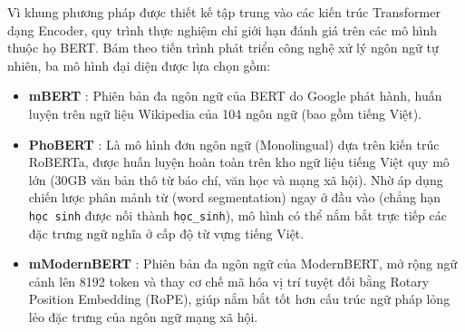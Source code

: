 Vì khung phương pháp được thiết kế tập trung vào các kiến trúc Transformer dạng Encoder, quy trình thực nghiệm chỉ giới hạn đánh giá trên các mô hình thuộc họ BERT. Bám theo tiến trình phát triển công nghệ xử lý ngôn ngữ tự nhiên, ba mô hình đại diện được lựa chọn gồm:
\begin{itemize}
    \item \textbf{mBERT} \parencite{devlin2019bert}: Phiên bản đa ngôn ngữ của BERT do Google phát hành, huấn luyện trên ngữ liệu Wikipedia của 104 ngôn ngữ (bao gồm tiếng Việt).
    \item \textbf{PhoBERT} \parencite{nguyen2020phobert}: Là mô hình đơn ngôn ngữ (Monolingual) dựa trên kiến trúc RoBERTa, được huấn luyện hoàn toàn trên kho ngữ liệu tiếng Việt quy mô lớn (30GB văn bản thô từ báo chí, văn học và mạng xã hội). Nhờ áp dụng chiến lược phân mảnh từ (word segmentation) ngay ở đầu vào (chẳng hạn \texttt{học sinh} được nối thành \texttt{học\_sinh}), mô hình có thể nắm bắt trực tiếp các đặc trưng ngữ nghĩa ở cấp độ từ vựng tiếng Việt.
    \item \textbf{mModernBERT} \parencite{warner2025smarter}: Phiên bản đa ngôn ngữ của ModernBERT, mở rộng ngữ cảnh lên 8192 token và thay cơ chế mã hóa vị trí tuyệt đối bằng Rotary Position Embedding (RoPE), giúp nắm bắt tốt hơn cấu trúc ngữ pháp lỏng lẻo đặc trưng của ngôn ngữ mạng xã hội.
\end{itemize}
